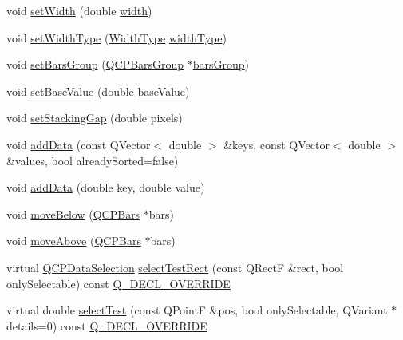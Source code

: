 \begin{DoxyCompactItemize}
\item 
void \hyperlink{class_q_c_p_bars_afec6116579d44d5b706e0fa5e5332507}{set\+Width} (double \hyperlink{class_q_c_p_bars_a42798c38abd5f5db22bd45d77f429625}{width})
\item 
void \hyperlink{class_q_c_p_bars_adcaa3b41281bb2c0f7949b341592fcc0}{set\+Width\+Type} (\hyperlink{class_q_c_p_bars_a65dbbf1ab41cbe993d71521096ed4649}{Width\+Type} \hyperlink{class_q_c_p_bars_a8606651ada5804075f6affd04c88dd05}{width\+Type})
\item 
void \hyperlink{class_q_c_p_bars_aedd1709061f0b307c47ddb45e172ef9a}{set\+Bars\+Group} (\hyperlink{class_q_c_p_bars_group}{Q\+C\+P\+Bars\+Group} $\ast$\hyperlink{class_q_c_p_bars_a6d6b2b17619a0ba9c7a88bb2b90fc178}{bars\+Group})
\item 
void \hyperlink{class_q_c_p_bars_a574ec7eb7537566df1a28ff085d75623}{set\+Base\+Value} (double \hyperlink{class_q_c_p_bars_a3c8686a74396883fd1da87b2e325b043}{base\+Value})
\item 
void \hyperlink{class_q_c_p_bars_aeacf7561afb1c70284b22822b57c7bb5}{set\+Stacking\+Gap} (double pixels)
\item 
void \hyperlink{class_q_c_p_bars_a323d6970d6d6e3166d89916a7f60f733}{add\+Data} (const Q\+Vector$<$ double $>$ \&keys, const Q\+Vector$<$ double $>$ \&values, bool already\+Sorted=false)
\item 
void \hyperlink{class_q_c_p_bars_a684dd105403a5497fda42f2094fecbb7}{add\+Data} (double key, double value)
\item 
void \hyperlink{class_q_c_p_bars_a69fc371346980f19177c3d1ecdad78ee}{move\+Below} (\hyperlink{class_q_c_p_bars}{Q\+C\+P\+Bars} $\ast$bars)
\item 
void \hyperlink{class_q_c_p_bars_ac22e00a6a41509538c21b04f0a57318c}{move\+Above} (\hyperlink{class_q_c_p_bars}{Q\+C\+P\+Bars} $\ast$bars)
\item 
virtual \hyperlink{class_q_c_p_data_selection}{Q\+C\+P\+Data\+Selection} \hyperlink{class_q_c_p_bars_ab03bb6125c3e983b89d694f75ce6b3d5}{select\+Test\+Rect} (const Q\+RectF \&rect, bool only\+Selectable) const \hyperlink{qcustomplot_8hh_a42cc5eaeb25b85f8b52d2a4b94c56f55}{Q\+\_\+\+D\+E\+C\+L\+\_\+\+O\+V\+E\+R\+R\+I\+DE}
\item 
virtual double \hyperlink{class_q_c_p_bars_a121f899c27af3186fe93dcd0eb98f49b}{select\+Test} (const Q\+PointF \&pos, bool only\+Selectable, Q\+Variant $\ast$details=0) const \hyperlink{qcustomplot_8hh_a42cc5eaeb25b85f8b52d2a4b94c56f55}{Q\+\_\+\+D\+E\+C\+L\+\_\+\+O\+V\+E\+R\+R\+I\+DE}
\item 

\end{DoxyCompactItemize}
